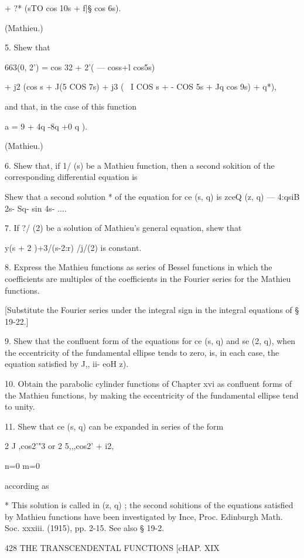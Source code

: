 {{+ ?* (sTO cos 10s + f|§ cos 6s). 

(Mathieu.) 

5. Shew that 

663(0, 2') = cos 32 + 2'( — coss+l cos5s) 

+ j2 (cos s + J(5 COS 7s) + j3 ( \  I COS s + -  COS 5s + Jq cos 9s) +  q*), 

and that, in the case of this function 

a = 9 + 4q -8q +0 q ). 

(Mathieu.) 

6. Shew that, if 1/ (s) be a Mathieu function, then a second sokition of the corresponding 
differential equation is 

Shew that a second solution * of the equation for ce  (s, q) is 
zceQ (z, q) — 4:qsiB 2s- Sq- sin 4s- .... 

7. If ?/ (2) be a solution of Mathieu's general equation, shew that 

 y(s + 2 )+3/(s-2:r) /j/(2) 
is constant. 

8. Express the Mathieu functions as series of Bessel functions in which the coefficients 
are multiples of the coefficients in the Fourier series for the Mathieu functions. 

[Substitute the Fourier series under the integral sign in the integral equations of 
§ 19-22.] 

9. Shew that the confluent form of the equations for ce  (s, q) and se  (2, q), when the 
eccentricity of the fundamental ellipse tends to zero, is, in each case, the equation satisfied 
by J,,  ii- eoH z). 

10. Obtain the parabolic cylinder functions of Chapter xvi as confluent forms of the 
Mathieu functions, by making the eccentricity of the fundamental ellipse tend to unity. 

11. Shew that ce  (s, q) can be expanded in series of the form 

2 J ,cos2'"3 or 2 5,,,cos2'  + i2, 

 n=0 m=0 

according as %

* This solution is called in  (z, q) ; the second sohitions of the equations satisfied by Mathieu 
functions have been investigated by Ince, Proc. Edinburgh Math. Soc. xxxiii. (1915), pp. 2-15. 
See also § 19-2. 



428 THE TRANSCENDENTAL FUNCTIONS [cHAP. XIX 

}}

